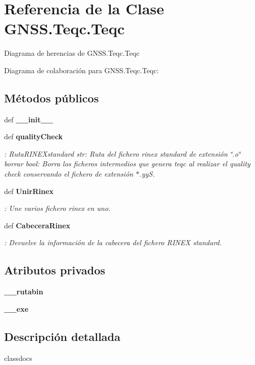\section{Referencia de la Clase G\-N\-S\-S.\-Teqc.\-Teqc}
\label{classGNSS_1_1Teqc_1_1Teqc}


Diagrama de herencias de G\-N\-S\-S.\-Teqc.\-Teqc


Diagrama de colaboración para G\-N\-S\-S.\-Teqc.\-Teqc\-:
\subsection*{Métodos públicos}
\begin{DoxyCompactItemize}
\item 
def {\bf \-\_\-\-\_\-init\-\_\-\-\_\-}
\item 
def {\bf quality\-Check}
\begin{DoxyCompactList}\small\item\em \-:  Ruta\-R\-I\-N\-E\-Xstandard str\-: Ruta del fichero rinex standard de extensión \char`\"{}.\-o\char`\"{}  borrar bool\-: Borra los ficheros intermedios que genera teqc al realizar el quality check conservando el fichero de extensión $\ast$.yy\-S. \end{DoxyCompactList}\item 
def {\bf Unir\-Rinex}
\begin{DoxyCompactList}\small\item\em \-: Une varios fichero rinex en uno. \end{DoxyCompactList}\item 
def {\bf Cabecera\-Rinex}
\begin{DoxyCompactList}\small\item\em \-: Devuelve la información de la cabecera del fichero R\-I\-N\-E\-X standard. \end{DoxyCompactList}\end{DoxyCompactItemize}
\subsection*{Atributos privados}
\begin{DoxyCompactItemize}
\item 
{\bf \-\_\-\-\_\-rutabin}
\item 
{\bf \-\_\-\-\_\-exe}
\end{DoxyCompactItemize}


\subsection{Descripción detallada}
\begin{DoxyVerb}classdocs
\end{DoxyVerb}
 

